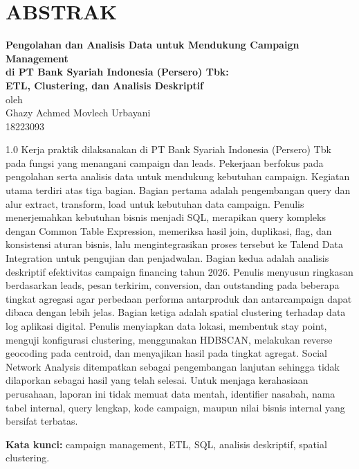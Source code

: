 \chapter*{ABSTRAK}
\begin{center}
\textbf{Pengolahan dan Analisis Data untuk Mendukung Campaign Management\\
di PT Bank Syariah Indonesia (Persero) Tbk:\\
ETL, Clustering, dan Analisis Deskriptif}\\
\vspace{0.4cm}
oleh\\
\vspace{0.4cm}
Ghazy Achmed Movlech Urbayani\\
18223093
\end{center}
\vspace{0.6cm}
\begin{spacing}{1.0}
Kerja praktik dilaksanakan di PT Bank Syariah Indonesia (Persero) Tbk pada fungsi yang menangani campaign dan leads. Pekerjaan berfokus pada pengolahan serta analisis data untuk mendukung kebutuhan campaign. Kegiatan utama terdiri atas tiga bagian. Bagian pertama adalah pengembangan query dan alur extract, transform, load untuk kebutuhan data campaign. Penulis menerjemahkan kebutuhan bisnis menjadi SQL, merapikan query kompleks dengan Common Table Expression, memeriksa hasil join, duplikasi, flag, dan konsistensi aturan bisnis, lalu mengintegrasikan proses tersebut ke Talend Data Integration untuk pengujian dan penjadwalan. Bagian kedua adalah analisis deskriptif efektivitas campaign financing tahun 2026. Penulis menyusun ringkasan berdasarkan leads, pesan terkirim, conversion, dan outstanding pada beberapa tingkat agregasi agar perbedaan performa antarproduk dan antarcampaign dapat dibaca dengan lebih jelas. Bagian ketiga adalah spatial clustering terhadap data log aplikasi digital. Penulis menyiapkan data lokasi, membentuk stay point, menguji konfigurasi clustering, menggunakan HDBSCAN, melakukan reverse geocoding pada centroid, dan menyajikan hasil pada tingkat agregat. Social Network Analysis ditempatkan sebagai pengembangan lanjutan sehingga tidak dilaporkan sebagai hasil yang telah selesai. Untuk menjaga kerahasiaan perusahaan, laporan ini tidak memuat data mentah, identifier nasabah, nama tabel internal, query lengkap, kode campaign, maupun nilai bisnis internal yang bersifat terbatas.\par\vspace{0.5cm}\noindent\textbf{Kata kunci:} campaign management, ETL, SQL, analisis deskriptif, spatial clustering.
\end{spacing}
